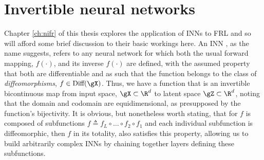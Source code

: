 \section{Invertible neural networks}\label{sec:inns}
%
%
Chapter \ref{ch:nifr} of this thesis explores the application of \acp{INN} to \ac{FRL} and so will
afford some brief discussion to their basic workings here.
%
%
An \acl{INN} \citep{kobyzev2020normalizing}, as the name suggests, refers to any neural network for
which both the usual forward mapping, \(f(\cdot)\), and its inverse \(f(\cdot)\) are defined, with
the assumed property that both are differentiable and as such that the function belongs to the
class of
\emph{diffeomorphisms}, \(f \in \text{Diff}(\gX)\). 
%
Thus, we have a function that is an invertible bicontinuous map from input space, \(\gX \subset
\R^d \) to latent space \(\gZ \subset \R^d \), noting that the domain and codomain are
equidimensional, as presupposed by the function's bijectivity.
%
It is obvious, but nonetheless worth stating, that for \(f\) is composed of subfunctions \(f
\triangleq f_L \circ \dots \circ f_2 \circ f_1\) and each individual subfunction is diffeomorphic,
then \(f\) in its totality, also satisfies this property, allowing us to build arbitrarily complex
INNs by chaining together layers defining these subfunctions.
%

